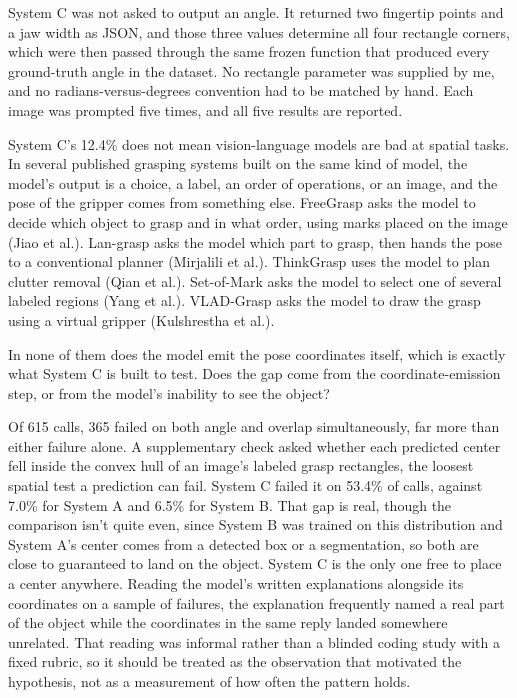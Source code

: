 \documentclass[12pt,letterpaper]{article}
\begin{document}
System C was not asked to output an angle. It returned two fingertip
points and a jaw width as JSON, and those three values determine all
four rectangle corners, which were then passed through the same frozen
function that produced every ground-truth angle in the dataset. No
rectangle parameter was supplied by me, and no radians-versus-degrees
convention had to be matched by hand. Each image was prompted five
times, and all five results are reported.

System C's 12.4\% does not mean vision-language models are bad at
spatial tasks. In several published grasping systems built on the same
kind of model, the model's output is a choice, a label, an order of
operations, or an image, and the pose of the gripper comes from
something else. FreeGrasp asks the model to decide which object to
grasp and in what order, using marks placed on the image (Jiao et al.).
Lan-grasp asks the model which part to grasp, then hands the pose to a
conventional planner (Mirjalili et al.). ThinkGrasp uses the model to
plan clutter removal (Qian et al.). Set-of-Mark asks the model to
select one of several labeled regions (Yang et al.). VLAD-Grasp asks
the model to draw the grasp using a virtual gripper (Kulshrestha et
al.).

In none of them does the model emit the pose coordinates itself, which
is exactly what System C is built to test. Does the gap come from the
coordinate-emission step, or from the model's inability to see the
object?

Of 615 calls, 365 failed on both angle and overlap simultaneously, far
more than either failure alone. A supplementary check asked whether
each predicted center fell inside the convex hull of an image's labeled
grasp rectangles, the loosest spatial test a prediction can fail.
System C failed it on 53.4\% of calls, against 7.0\% for System A and
6.5\% for System B. That gap is real, though the comparison isn't quite
even, since System B was trained on this distribution and System A's
center comes from a detected box or a segmentation, so both are close
to guaranteed to land on the object. System C is the only one free to
place a center anywhere. Reading the model's written explanations
alongside its coordinates on a sample of failures, the explanation
frequently named a real part of the object while the coordinates in the
same reply landed somewhere unrelated. That reading was informal rather
than a blinded coding study with a fixed rubric, so it should be
treated as the observation that motivated the hypothesis, not as a
measurement of how often the pattern holds.
\end{document}
